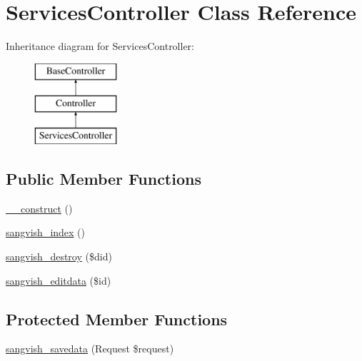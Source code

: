 \hypertarget{class_responsive_1_1_http_1_1_controllers_1_1_services_controller}{}\section{Services\+Controller Class Reference}
\label{class_responsive_1_1_http_1_1_controllers_1_1_services_controller}
Inheritance diagram for Services\+Controller\+:\begin{figure}[H]
\begin{center}
\leavevmode
\includegraphics[height=3.000000cm]{class_responsive_1_1_http_1_1_controllers_1_1_services_controller}
\end{center}
\end{figure}
\subsection*{Public Member Functions}
\begin{DoxyCompactItemize}
\item 
\mbox{\hyperlink{class_responsive_1_1_http_1_1_controllers_1_1_services_controller_a095c5d389db211932136b53f25f39685}{\+\_\+\+\_\+construct}} ()
\item 
\mbox{\hyperlink{class_responsive_1_1_http_1_1_controllers_1_1_services_controller_a102ddc90c5f30fa7831dcf999b905ad1}{sangvish\+\_\+index}} ()
\item 
\mbox{\hyperlink{class_responsive_1_1_http_1_1_controllers_1_1_services_controller_a4ef7021a71a781742edf692230b3626b}{sangvish\+\_\+destroy}} (\$did)
\item 
\mbox{\hyperlink{class_responsive_1_1_http_1_1_controllers_1_1_services_controller_a630f91fa525b55af595df8a2fbf882d4}{sangvish\+\_\+editdata}} (\$id)
\end{DoxyCompactItemize}
\subsection*{Protected Member Functions}
\begin{DoxyCompactItemize}
\item 
\mbox{\hyperlink{class_responsive_1_1_http_1_1_controllers_1_1_services_controller_a63d8d498a130e9f530dd9de0247a0c74}{sangvish\+\_\+savedata}} (Request \$request)
\end{DoxyCompactItemize}


